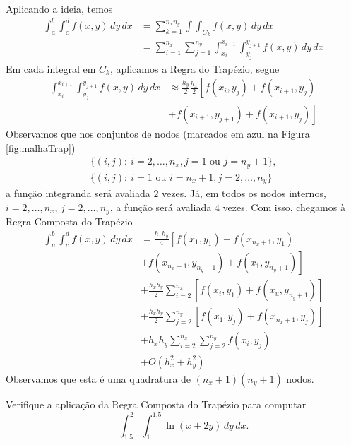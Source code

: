 Aplicando a ideia, temos
\begin{align}
  \int_a^b\int_c^d f(x,y)\,dy\,dx &= \sum_{k=1}^{n_xn_y}\int\int_{C_k} f(x,y)\,dy\,dx\\
                                  &= \sum_{i=1}^{n_x}\sum_{j=1}^{n_y}\int_{x_i}^{x_{i+1}}\int_{y_j}^{y_{j+1}} f(x,y)\,dy\,dx
\end{align}
Em cada integral em $C_k$, aplicamos a Regra do Trapézio, segue
\begin{align}
  \int_{x_i}^{x_{i+1}}\int_{y_j}^{y_{j+1}} f(x,y)\,dy\,dx &\approx \frac{h_y}{2}\frac{h_x}{2}\left[f(x_i,y_j) + f(x_{i+1},y_j)\right.\\
                                                          &+ \left.f(x_{i+1},y_{j+1}) + f(x_{i+1},y_{j})\right]
\end{align}
Observamos que nos conjuntos de nodos (marcados em azul na Figura \ref{fig:malhaTrap})
\begin{gather}
  \{(i,j):~i=2,\dotsc,n_x,j=1\text{ ou }j=n_y+1\},\\
  \{(i,j):~i=1\text{ ou }i=n_x+1,j=2,\dotsc,n_y\}
\end{gather}
a função integranda será avaliada $2$ vezes. Já, em todos os nodos internos, $i=2,\dotsc,n_x$, $j=2,\dotsc,n_y$, a função será avaliada $4$ vezes. Com isso, chegamos à Regra Composta do Trapézio
\begin{align}
  \int_a^b\int_c^d f(x,y)\,dy\,dx &= \frac{h_xh_y}{4}\left[f(x_1,y_1)+f(x_{n_x+1},y_1)\right.\nonumber\\
                                  &\left. + f(x_{n_x+1},y_{n_y+1})+f(x_{1},y_{n_y+1})\right]\nonumber\\
                                  &+ \frac{h_xh_y}{2}\sum_{i=2}^{n_x}\left[f(x_i,y_1) + f(x_u,y_{n_y+1})\right]\nonumber\\
                                  &+ \frac{h_xh_y}{2}\sum_{j=2}^{n_y}\left[f(x_1,y_j) + f(x_{n_x+1},y_j)\right]\nonumber\\
                                  &+ h_xh_y\sum_{i=2}^{n_x}\sum_{j=2}^{n_y}f(x_i,y_j)\nonumber\\
                                  &+ O(h_x^2 + h_y^2)
\end{align}
Observamos que esta é uma quadratura de $(n_x+1)(n_y+1)$ nodos.

\begin{exer}
  Verifique a aplicação da Regra Composta do Trapézio para computar
  \begin{equation}
    \int_{1.5}^{2}\int_{1}^{1.5}\ln(x + 2y)\,dy\,dx.
  \end{equation}
\end{exer}

